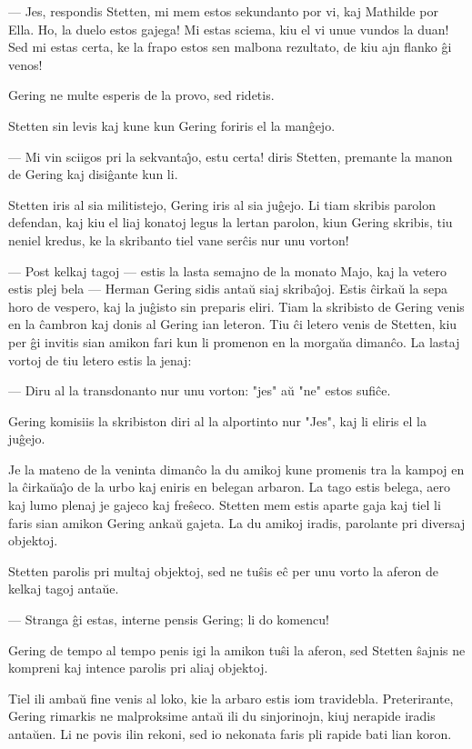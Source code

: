 --- Jes, respondis Stetten, mi mem estos sekundanto por vi, kaj
Mathilde por Ella. Ho, la duelo estos gajega! Mi estas sciema, kiu
el vi unue vundos la duan! Sed mi estas certa, ke la frapo estos sen
malbona rezultato, de kiu ajn flanko \^gi venos!

   Gering ne multe esperis de la provo, sed ridetis.

   Stetten sin levis kaj kune kun Gering foriris el la man\^gejo.

 --- Mi vin sciigos pri la sekvanta\^{\j}o, estu certa! diris Stetten,
premante la manon de Gering kaj disi\^gante kun li.

   Stetten iris al sia militistejo, Gering iris al sia ju\^gejo. Li
tiam skribis parolon defendan, kaj kiu el liaj konatoj legus la
lertan parolon, kiun Gering skribis, tiu neniel kredus, ke la
skribanto tiel vane ser\^cis nur unu vorton!

 --- Post kelkaj tagoj --- estis la lasta semajno de la monato Majo,
kaj la vetero estis plej bela --- Herman Gering sidis anta\u u siaj
skriba\^{\j}oj. Estis \^cirka\u u la sepa horo de vespero, kaj la
ju\^gisto sin preparis eliri. Tiam la skribisto de Gering venis en
la \^cambron kaj donis al Gering ian leteron. Tiu \^ci letero venis
de Stetten, kiu per \^gi invitis sian amikon fari kun li promenon en
la morga\u ua diman\^co. La lastaj vortoj de tiu letero estis la
jenaj:

 --- Diru al la transdonanto nur unu vorton: "jes" a\u u "ne" estos
sufi\^ce.

   Gering komisiis la skribiston diri al la alportinto nur "Jes", kaj li
eliris el la ju\^gejo.

   Je la mateno de la veninta diman\^co la du amikoj kune promenis tra
la kampoj en la \^cirka\u ua\^{\j}o de la urbo kaj eniris en belegan
arbaron. La tago estis belega, aero kaj lumo plenaj je gajeco kaj
fre\^seco. Stetten mem estis aparte gaja kaj tiel li faris sian
amikon Gering anka\u u gajeta. La du amikoj iradis, parolante pri
diversaj objektoj.

   Stetten parolis pri multaj objektoj, sed ne tu\^sis e\^c per unu vorto
la aferon de kelkaj tagoj anta\u ue.

 --- Stranga \^gi estas, interne pensis Gering; li do komencu!

   Gering de tempo al tempo penis igi la amikon tu\^si la aferon, sed
Stetten \^sajnis ne kompreni kaj intence parolis pri aliaj objektoj.

   Tiel ili amba\u u fine venis al loko, kie la arbaro estis iom
travidebla. Preterirante, Gering rimarkis ne malproksime anta\u u
ili du sinjorinojn, kiuj nerapide iradis anta\u uen. Li ne povis
ilin rekoni, sed io nekonata faris pli rapide bati lian koron.


